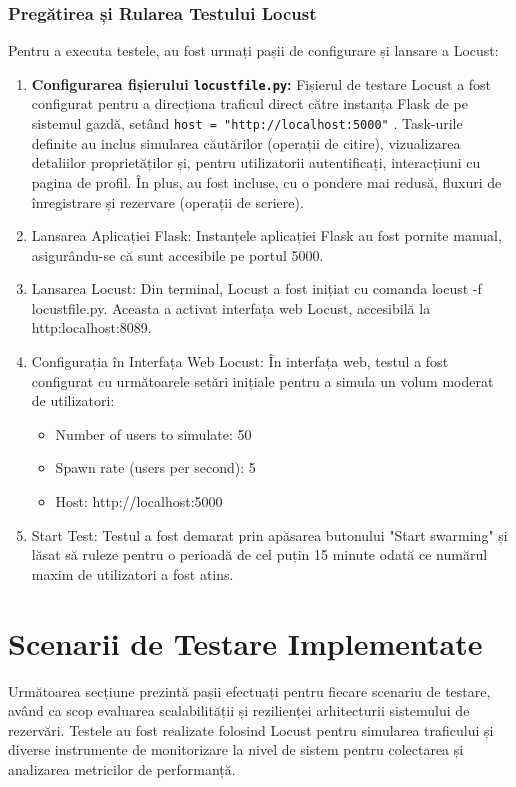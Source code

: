 \documentclass[12pt, a4paper, oneside, romanian]{teza-upb}
\begin{document}
\subsubsection{Pregătirea și Rularea Testului Locust}
Pentru a executa testele, au fost urmați pașii de configurare și lansare a Locust:
\begin{enumerate}
	\item \textbf{Configurarea fișierului \texttt{locustfile.py}:} Fișierul de testare Locust a fost configurat pentru a direcționa traficul direct către instanța Flask de pe sistemul gazdă, setând \texttt{host = "http://localhost:5000"}
. Task-urile definite au inclus simularea căutărilor (operații de citire), vizualizarea detaliilor proprietăților și, pentru utilizatorii autentificați, interacțiuni cu pagina de profil. În plus, au fost incluse, cu o pondere mai redusă, fluxuri de înregistrare și rezervare (operații de scriere).
	\item Lansarea Aplicației Flask: Instanțele aplicației Flask au fost pornite manual, asigurându-se că sunt accesibile pe portul 5000.
	\item Lansarea Locust: Din terminal, Locust a fost inițiat cu comanda locust -f locustfile.py. Aceasta a activat interfața web Locust, accesibilă la http:\/\/localhost:8089.
	\item Configurația în Interfața Web Locust: În interfața web, testul a fost configurat cu următoarele setări inițiale pentru a simula un volum moderat de utilizatori:
	\begin{itemize}
		\item Number of users to simulate: 50
		\item Spawn rate (users per second): 5
		\item Host: http://localhost:5000
	\end{itemize}
	\item Start Test: Testul a fost demarat prin apăsarea butonului "Start swarming" și lăsat să ruleze pentru o perioadă de cel puțin 15 minute odată ce numărul maxim de utilizatori a fost atins.
	
\end{enumerate}

\section{Scenarii de Testare Implementate}


Următoarea secțiune prezintă pașii efectuați pentru fiecare scenariu de testare, având ca scop evaluarea scalabilității și rezilienței arhitecturii sistemului de rezervări. Testele au fost realizate folosind Locust pentru simularea traficului și diverse instrumente de monitorizare la nivel de sistem pentru colectarea și analizarea metricilor de performanță.
\end{document}
